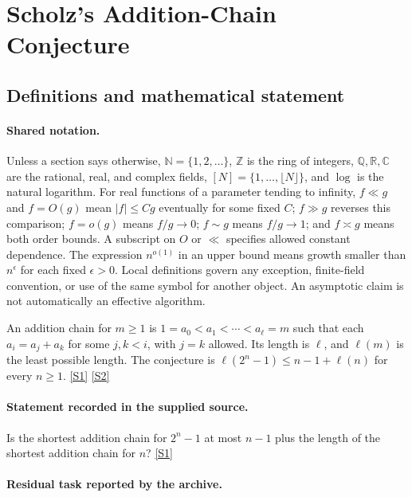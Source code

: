 \documentclass[11pt,a4paper]{article}
\newcommand{\N}{\mathbb{N}}
\newcommand{\Z}{\mathbb{Z}}
\newcommand{\Q}{\mathbb{Q}}
\newcommand{\R}{\mathbb{R}}
\newcommand{\C}{\mathbb{C}}
\newcommand{\sref}[2]{\hyperlink{source:#1:#2}{[S#2]}}
\begin{document}
\section{Scholz's Addition-Chain Conjecture}\label{statement}


\subsection{Definitions and mathematical statement}

\paragraph{Shared notation.}Unless a section says otherwise, $\N=\{1,2,\ldots\}$,
$\Z$ is the ring of integers, $\Q,\R,\C$ are the rational, real, and complex
fields, $[N]=\{1,\ldots,\lfloor N\rfloor\}$, and $\log$ is the natural
logarithm. For real functions of a parameter tending to infinity,
$f\ll g$ and $f=O(g)$ mean $|f|\leq Cg$ eventually for some fixed $C$;
$f\gg g$ reverses this comparison; $f=o(g)$ means $f/g\to0$;
$f\sim g$ means $f/g\to1$; and $f\asymp g$ means both order bounds.
A subscript on $O$ or $\ll$ specifies allowed constant dependence.
The expression $n^{o(1)}$ in an upper bound means growth smaller than
$n^\epsilon$ for each fixed $\epsilon>0$. Local definitions govern any
exception, finite-field convention, or use of the same symbol for another
object. An asymptotic claim is not automatically an effective algorithm.



An addition chain for $m\geq1$ is $1=a_0<a_1<\cdots<a_\ell=m$ such that each $a_i=a_j+a_k$ for some $j,k<i$, with $j=k$ allowed. Its length is $\ell$, and $\ell(m)$ is the least possible length. The conjecture is $\ell(2^n-1)\leq n-1+\ell(n)$ for every $n\geq1$. \sref{statement}{1} \sref{statement}{2}

\paragraph{Statement recorded in the supplied source.}
Is the shortest addition chain for $2^n - 1$ at most $n - 1$ plus the length of the shortest addition chain for $n$? \sref{statement}{1}

\paragraph{Residual task reported by the archive.}
\end{document}
